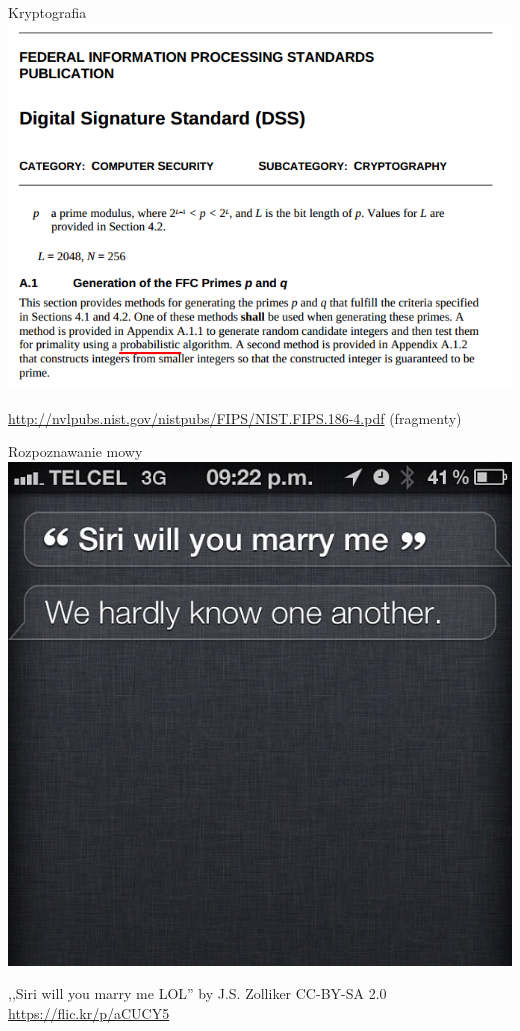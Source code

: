 \documentclass{mp}
\begin{document}
\begin{frame}{Kryptografia}
\centering\includegraphics[width=.85\textwidth]{dsa.png}

{\tiny \url{http://nvlpubs.nist.gov/nistpubs/FIPS/NIST.FIPS.186-4.pdf} (fragmenty)}
\end{frame}
\begin{frame}{Rozpoznawanie mowy}
\centering\includegraphics[width=.8\textwidth,viewport=0 50mm 220mm 220mm,clip]{siri.jpg}

{\tiny ,,Siri will you marry me LOL'' by J.S. Zolliker CC-BY-SA 2.0 \url{https://flic.kr/p/aCUCY5}}
\end{frame}
\end{document}
